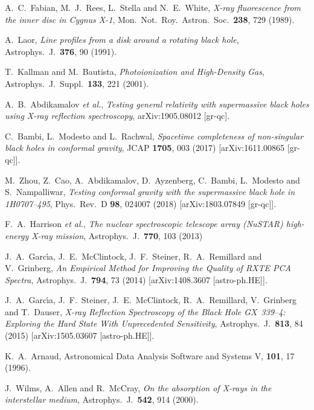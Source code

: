 \documentclass[11pt,a4paper,pdftex]{article}
\begin{document}
\begin{thebibliography}{99}
  A.~C.~Fabian, M.~J.~Rees, L.~Stella and N.~E.~White,
  {\it X-ray fluorescence from the inner disc in Cygnus X-1},
  Mon.\ Not.\ Roy.\ Astron.\ Soc.\  {\bf 238}, 729 (1989).

  A.~Laor,
  {\it Line profiles from a disk around a rotating black hole},
  Astrophys.\ J.\  {\bf 376}, 90 (1991).  

  T.~Kallman and M.~Bautista,
  {\it Photoionization and High-Density Gas},
  Astrophys.\ J.\ Suppl.\  {\bf 133}, 221 (2001).  
  
  A.~B.~Abdikamalov {\it et al.},
  {\it Testing general relativity with supermassive black holes using X-ray reflection spectroscopy},
  arXiv:1905.08012 [gr-qc].  

  C.~Bambi, L.~Modesto and L.~Rachwal,
  {\it Spacetime completeness of non-singular black holes in conformal gravity},
  JCAP {\bf 1705}, 003 (2017)
  [arXiv:1611.00865 [gr-qc]].

  M.~Zhou, Z.~Cao, A.~Abdikamalov, D.~Ayzenberg, C.~Bambi, L.~Modesto and S.~Nampalliwar,
  {\it Testing conformal gravity with the supermassive black hole in 1H0707--495},
  Phys.\ Rev.\ D {\bf 98}, 024007 (2018)
  [arXiv:1803.07849 [gr-qc]].
  
  F.~A.~Harrison {\it et al.},
  {\it The nuclear spectroscopic telescope array (NuSTAR) high-energy X-ray mission},
  Astrophys.\ J.\  {\bf 770}, 103 (2013)

  J.~A.~Garc{\'\i}a, J.~E.~McClintock, J.~F.~Steiner, R.~A.~Remillard and V.~Grinberg,
  {\it An Empirical Method for Improving the Quality of RXTE PCA Spectra},
Astrophys.\ J.\  {\bf 794}, 73 (2014)
[arXiv:1408.3607 [astro-ph.HE]].

  J.~A.~Garc{\'\i}a, J.~F.~Steiner, J.~E.~McClintock, R.~A.~Remillard, V.~Grinberg and T.~Dauser,
  {\it X-ray Reflection Spectroscopy of the Black Hole GX~339--4: Exploring the Hard State With Unprecedented Sensitivity},
Astrophys.\ J.\  {\bf 813}, 84 (2015)
[arXiv:1505.03607 [astro-ph.HE]]. 
  
  K.~A.~Arnaud,
  Astronomical Data Analysis Software and Systems V, {\bf 101}, 17 (1996).
  
J.~Wilms, A.~Allen and R.~McCray, 
{\it On the absorption of X-rays in the interstellar medium},
Astrophys.\ J.\  {\bf 542}, 914 (2000).
  

\end{thebibliography}
\end{document}
